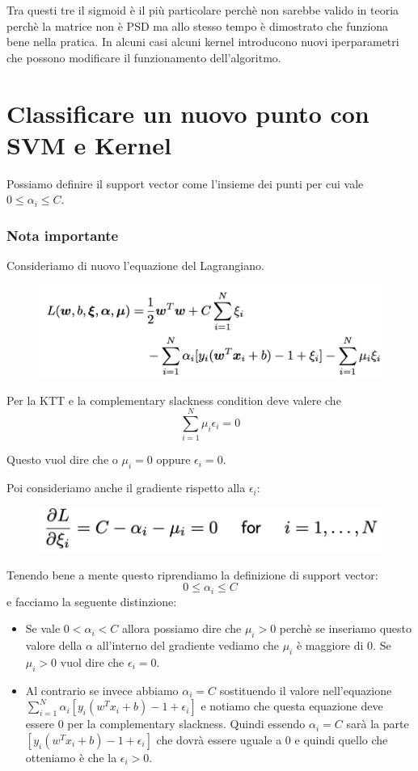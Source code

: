 \documentclass[14pt]{extreport}
\begin{document}
Tra questi tre il sigmoid è il più particolare perchè non sarebbe valido in teoria perchè la matrice non è PSD ma allo stesso tempo è dimostrato che
funziona bene nella pratica. In alcuni casi alcuni kernel introducono nuovi iperparametri che possono modificare il funzionamento dell'algoritmo.

\section{Classificare un nuovo punto con SVM e Kernel}

Possiamo definire il support vector come l'insieme dei punti per cui vale $0 \leq \alpha_i \leq C$. 

\subsubsection{Nota importante}

Consideriamo di nuovo l'equazione del Lagrangiano.
\begin{figure}[H]
\centering
\includegraphics[width=0.7\linewidth]{350.jpeg}
\end{figure}

Per la KTT e la complementary slackness condition deve valere che $$\sum_{i=1}^N \mu_i \epsilon_i = 0$$

Questo vuol dire che o $\mu_i = 0$ oppure $\epsilon_i=0$.

Poi consideriamo anche il gradiente rispetto alla $\epsilon_i$:

\begin{figure}[H]
\centering
\includegraphics[width=0.7\linewidth]{351.jpeg}
\end{figure}

Tenendo bene a mente questo riprendiamo la definizione di support vector: $$0 \leq \alpha_i \leq C$$ e facciamo la seguente distinzione:
\begin{itemize}
\item Se vale $0 < \alpha_i < C$ allora possiamo dire che $\mu_i > 0$ perchè se inseriamo questo valore della $\alpha$ all'interno del gradiente
vediamo che $\mu_i$ è maggiore di 0. Se $\mu_i > 0$ vuol dire che $\epsilon_i = 0$.
\item Al contrario se invece abbiamo $\alpha_i = C$ sostituendo il valore nell'equazione $\sum_{i=1}^N \alpha_i[y_i(w^Tx_i+b)-1+\epsilon_i]$ e notiamo che questa equazione
deve essere 0 per la complementary slackness. Quindi essendo $\alpha_i = C$ sarà la parte $[y_i(w^Tx_i+b)-1+\epsilon_i]$ che dovrà essere uguale a 0 e quindi quello che otteniamo
è che la $\epsilon_i > 0$.
\end{itemize}
\end{document}
